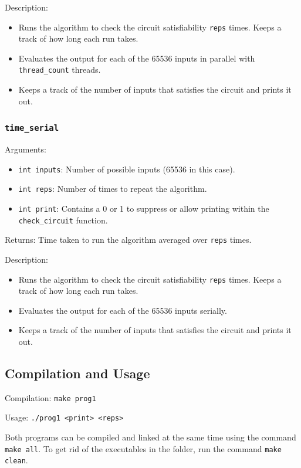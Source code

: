 \documentclass{article}
\begin{document}
\medskip
\noindent
Description: 
\begin{itemize}
    \item Runs the algorithm to check the circuit satisfiability \texttt{reps} times. Keeps a track of how long each run takes.

    \item Evaluates the output for each of the 65536 inputs in parallel with \texttt{thread\_count} threads.

    \item Keeps a track of the number of inputs that satisfies the circuit and prints it out.
\end{itemize}

\subsubsection{\texttt{time\_serial}}
Arguments: 
    \begin{itemize}
	    \item \texttt{int inputs}: Number of possible inputs (65536 in this case).
	    \item \texttt{int reps}: Number of times to repeat the algorithm.
        \item \texttt{int print}: Contains a 0 or 1 to suppress or allow printing within the \texttt{check\_circuit} function.
    \end{itemize}
Returns: Time taken to run the algorithm averaged over \texttt{reps} times.

\medskip
\noindent
Description: 
\begin{itemize}
    \item Runs the algorithm to check the circuit satisfiability \texttt{reps} times. Keeps a track of how long each run takes.

    \item Evaluates the output for each of the 65536 inputs serially.

    \item Keeps a track of the number of inputs that satisfies the circuit and prints it out.
\end{itemize}

\subsection{Compilation and Usage}
Compilation: \texttt{make prog1}

\noindent
Usage: \texttt{./prog1 <print> <reps>}

\medskip
\noindent
Both programs can be compiled and linked at the same time using the command \texttt{make all}. To get rid of the executables in the folder, run the command \texttt{make clean}.
\end{document}
